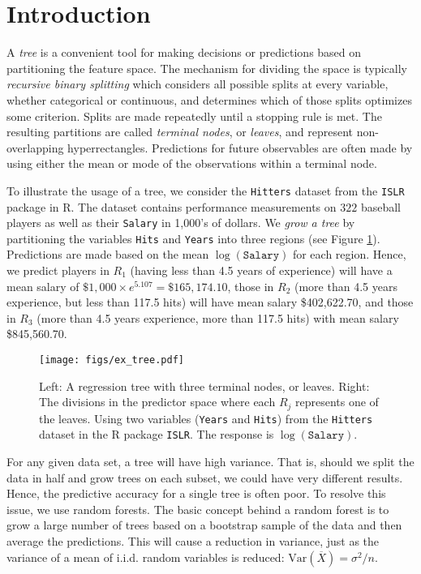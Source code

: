 \section{Introduction} %

A \emph{tree} is a convenient tool for making decisions or predictions based on partitioning the feature space. The mechanism for dividing the space is typically \emph{recursive binary splitting} which considers all possible splits at every variable, whether categorical or continuous, and determines which of those splits optimizes some criterion. Splits are made repeatedly until a stopping rule is met. The resulting partitions are called \emph{terminal nodes}, or \emph{leaves}, and represent non-overlapping hyperrectangles. Predictions for future observables are often made by using either the mean or mode of the observations within a terminal node.

To illustrate the usage of a tree, we consider the \texttt{Hitters} dataset from the \texttt{ISLR} package in R. The dataset contains performance measurements on $322$ baseball players as well as their \texttt{Salary} in 1,000's of dollars. We \emph{grow a tree} by partitioning the variables \texttt{Hits} and \texttt{Years} into three regions (see Figure \ref{tree1}). Predictions are made based on the mean $\log(\mathtt{Salary})$ for each region. Hence, we predict players in $R_1$ (having less than 4.5 years of experience) will have a mean salary of $\$1,000\times e^{5.107}=\$165,174.10$, those in $R_2$ (more than 4.5 years experience, but less than 117.5 hits) will have mean salary \$402,622.70, and those in $R_3$ (more than 4.5 years experience, more than 117.5 hits) with mean salary \$845,560.70. %

\begin{figure}
\begin{center}
\texttt{[image: figs/ex\_tree.pdf]}
\caption{Left: A regression tree with three terminal nodes, or leaves. Right: The divisions in the predictor space where each $R_j$ represents one of the leaves. Using two variables (\texttt{Years} and \texttt{Hits}) from the \texttt{Hitters} dataset in the R package \texttt{ISLR}. The response is $\log(\mathtt{Salary})$.}
\label{tree1}
\end{center}
\end{figure}

For any given data set, a tree will have high variance. That is, should we split the data in half and grow trees on each subset, we could have very different results. Hence, the predictive accuracy for a single tree is often poor. To resolve this issue, we use random forests. The basic concept behind a random forest is to grow a large number of trees based on a bootstrap sample of the data and then average the predictions. This will cause a reduction in variance, just as the variance of a mean of i.i.d. random variables is reduced: $\mathrm{Var}(\overline{X}) = \sigma^2/n$.

